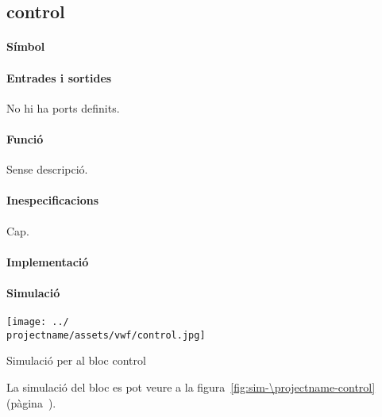 \subsection{\label{sub:\projectname-control} \textsf{control}}

\paragraph{Símbol}

\begin{center}  \end{center}

\paragraph{Entrades i sortides}

No hi ha ports definits.

\paragraph{Funció}

Sense descripció.

\paragraph{Inespecificacions}

Cap.

\paragraph{Implementació}





\paragraph{Simulació}

\begin{contendfig}
  \begin{center}
    \texttt{[image: ../\\projectname/assets/vwf/control.jpg]}
  \end{center}
  \caption{\label{fig:sim-\projectname-control} Simulació per al bloc \textsf{control}}
\end{contendfig}

La simulació del bloc es pot veure a la figura~\ref{fig:sim-\projectname-control} (pàgina~\pageref{fig:sim-\projectname-control}).


\vspace{1cm}
